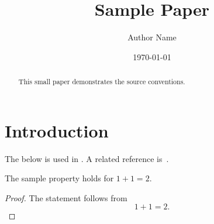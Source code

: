 \documentclass[12pt]{article}
\title{Sample Paper}
\author{Author Name}
\date{\today}
\begin{document}
\maketitle

\begin{abstract}
    This small paper demonstrates the source conventions.
\end{abstract}

\section{Introduction}
%

The  below is used in .
A related reference is~\cite{sample}.

\begin{lemma}
    The sample property holds for $1+1=2$.
\end{lemma}

\begin{proof}
    The statement follows from
    \[
        1+1=2.
    \]
\end{proof}

\printbibliography
\end{document}
